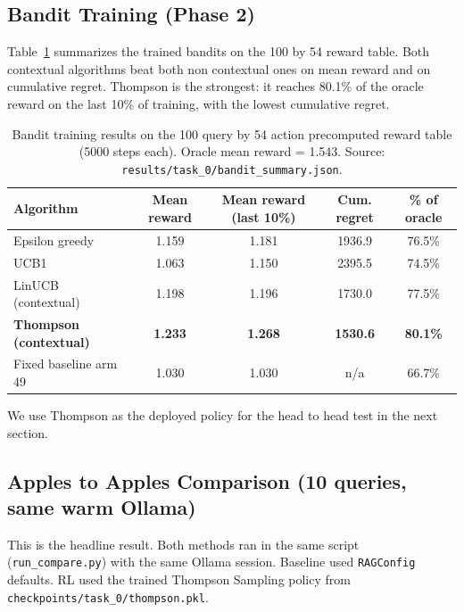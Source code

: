 \documentclass{article}
\begin{document}
\subsection{Bandit Training (Phase 2)}

Table~\ref{tab:bandit_train} summarizes the trained bandits on the 100 by 54 reward table. Both contextual algorithms beat both non contextual ones on mean reward and on cumulative regret. Thompson is the strongest: it reaches 80.1\% of the oracle reward on the last 10\% of training, with the lowest cumulative regret.

\begin{table}[h]
\centering
\caption{Bandit training results on the 100 query by 54 action precomputed reward table (5000 steps each). Oracle mean reward = 1.543. Source: \texttt{results/task\_0/bandit\_summary.json}.}
\label{tab:bandit_train}
\small
\begin{tabular}{lcccc}
\toprule
Algorithm & Mean reward & Mean reward (last 10\%) & Cum. regret & \% of oracle \\
\midrule
Epsilon greedy           & 1.159 & 1.181 & 1936.9 & 76.5\% \\
UCB1                     & 1.063 & 1.150 & 2395.5 & 74.5\% \\
LinUCB (contextual)      & 1.198 & 1.196 & 1730.0 & 77.5\% \\
\textbf{Thompson (contextual)} & \textbf{1.233} & \textbf{1.268} & \textbf{1530.6} & \textbf{80.1\%} \\
\midrule
Fixed baseline arm 49    & 1.030 & 1.030 & n/a & 66.7\% \\
\bottomrule
\end{tabular}
\end{table}

We use Thompson as the deployed policy for the head to head test in the next section.

\subsection{Apples to Apples Comparison (10 queries, same warm Ollama)}

This is the headline result. Both methods ran in the same script (\texttt{run\_compare.py}) with the same Ollama session. Baseline used \texttt{RAGConfig} defaults. RL used the trained Thompson Sampling policy from \texttt{checkpoints/task\_0/thompson.pkl}.
\end{document}
